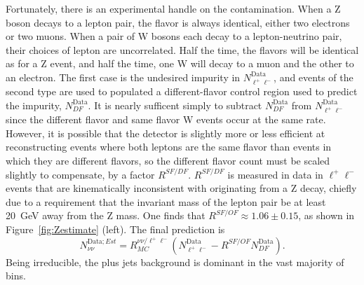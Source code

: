     Fortunately, there is an experimental handle on the contamination.
    When a Z boson decays to a lepton pair, the flavor is always identical, either two electrons or two muons.
    When a pair of W bosons each decay to a lepton-neutrino pair, their choices of lepton are uncorrelated.
    Half the time, the flavors will be identical as for a Z event, and half the time, one W will decay to a muon and the other to an electron.
    The first case is the undesired impurity in $N_{\ell^+\ell^-}^{\mathrm{Data}}$, and events of the second type are used to populated a different-flavor control region used to predict the impurity, $N_{DF}^{\mathrm{Data}}$.
    It is nearly sufficent simply to subtract $N_{DF}^{\mathrm{Data}}$ from $N_{\ell^+\ell^-}^{\mathrm{Data}}$ since the different flavor and same flavor W events occur at the same rate.
    However, it is possible that the detector is slightly more or less efficient at reconstructing events where both leptons are the same flavor than events in which they are different flavors, so the different flavor count must be scaled slightly to compensate, by a factor $R^{SF/DF}$.
    $R^{SF/DF}$ is measured in data in $\ell^+\ell^-$ events that are kinematically inconsistent with originating from a Z decay, chiefly due to a requirement that the invariant mass of the lepton pair be at least 20~GeV away from the Z mass.
    One finds that $R^{SF/OF} \approx 1.06 \pm 0.15$, as shown in Figure~\ref{fig:Zestimate} (left).
    The final prediction is
    \begin{equation}
      N_{\nu\nu}^{\mathrm{Data};Est} = R_{MC}^{\nu\nu/\ell^+\ell^-}(N^{\mathrm{Data}}_{\ell^+\ell^-}-R^{SF/OF}N_{DF}^{\mathrm{Data}}).
    \end{equation}
    Being irreducible, the \znunu plus jets background is dominant in the vast majority of bins.

